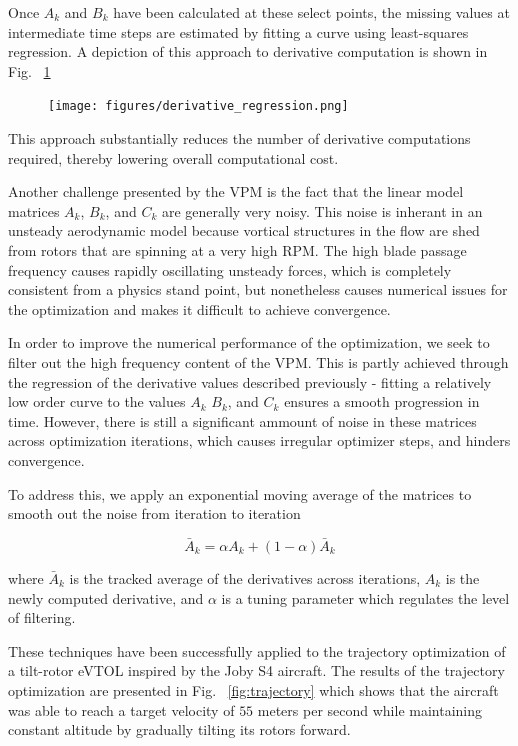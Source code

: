 \documentclass[12pt, letterpaper]{article}
\begin{document}
Once $A_k$ and $B_k$ have been calculated at these select points, the missing values at intermediate time steps are estimated by fitting a curve using least-squares regression. A depiction of this approach to derivative computation is shown in Fig. ~\ref{fig:derivative_regression}

\begin{figure}[hbt!]
\centering
\texttt{[image: figures/derivative\_regression.png]}
\caption{}
\label{fig:derivative_regression}
\end{figure}

This approach substantially reduces the number of derivative computations required, thereby lowering overall computational cost. 

Another challenge presented by the VPM is the fact that the linear model matrices $A_k$, $B_k$, and $C_k$ are generally very noisy.  This noise is inherant in an unsteady aerodynamic model because vortical structures in the flow are shed from rotors that are spinning at a very high RPM. The high blade passage frequency causes rapidly oscillating unsteady forces, which is completely consistent from a physics stand point, but nonetheless causes numerical issues for the optimization and makes it difficult to achieve convergence. 

In order to improve the numerical performance of the optimization, we seek to filter out the high frequency content of the VPM.  This is partly achieved through the regression of the derivative values described previously - fitting a relatively low order curve to the values $A_k$ $B_k$, and $C_k$ ensures a smooth progression in time.  However, there is still a significant ammount of noise in these matrices across optimization iterations, which causes irregular optimizer steps, and hinders convergence.

To address this, we apply an exponential moving average of the matrices to smooth out the noise from iteration to iteration

\begin{equation}
\label{eq:EMA}
    \bar{A}_k = \alpha A_k + (1 - \alpha) \bar{A}_k
\end{equation}

where $\bar{A}_k$ is the tracked average of the derivatives across iterations, $A_k$ is the newly computed derivative, and $\alpha$ is a tuning parameter which regulates the level of filtering.

These techniques have been successfully applied to the trajectory optimization of a tilt-rotor eVTOL inspired by the Joby S4 aircraft.  The results of the trajectory optimization are presented in Fig. ~\ref{fig:trajectory} which shows that the aircraft was able to reach a target velocity of $55$ meters per second while maintaining constant altitude by gradually tilting its rotors forward.
\end{document}
